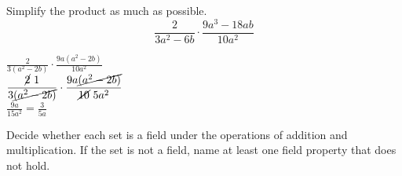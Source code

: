 \documentclass[12pt]{exam}
\begin{document}
\begin{questions}

\question[5]
Simplify the product as much as possible.
\[ \frac{2}{3a^2 - 6b} \cdot \frac{9a^3 - 18ab}{10a^2} \]
\begin{minipage}[t][4cm][t]{\linewidth}
    $\displaystyle \frac{2}{3(a^2-2b)} \cdot \frac{9a(a^2-2b)}{10a^2}$
    \\[10pt] $\displaystyle \frac{\cancel{2} \ 1}{3\cancel{(a^2-2b)}} \cdot \frac{9a\cancel{(a^2-2b)}}{\cancel{10} \ 5a^2}$
    \\[10pt] $\displaystyle \frac{9a}{15a^2} = \boxed{\frac{3}{5a}}$
\end{minipage}


\question[12]
Decide whether each set is a field under the operations of addition and multiplication. If the set is not a field, name at least one field property that does not hold.

\end{questions}
\end{document}
